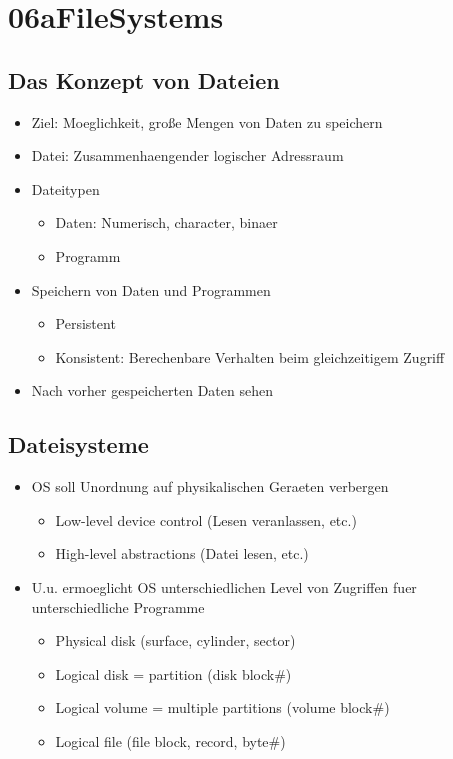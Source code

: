 \documentclass[a4paper]{scrreprt}
\begin{document}
\chapter{06aFileSystems}

\section{Das Konzept von Dateien}
\begin{itemize}
	\item Ziel: Moeglichkeit, große Mengen von Daten zu speichern
	\item Datei: Zusammenhaengender logischer Adressraum
	\item Dateitypen
		\begin{itemize}
			\item Daten: Numerisch, character, binaer
			\item Programm
		\end{itemize}
	\item Speichern von Daten und Programmen
		\begin{itemize}
			\item Persistent
			\item Konsistent: Berechenbare Verhalten beim gleichzeitigem Zugriff
		\end{itemize}
	\item Nach vorher gespeicherten Daten sehen
\end{itemize}

\section{Dateisysteme}
\begin{itemize}
	\item OS soll Unordnung auf physikalischen Geraeten verbergen
		\begin{itemize}
			\item Low-level device control (Lesen veranlassen, etc.)
			\item High-level abstractions (Datei lesen, etc.)
		\end{itemize}
	\item U.u. ermoeglicht OS unterschiedlichen Level von Zugriffen fuer unterschiedliche Programme
		\begin{itemize}
			\item Physical disk (surface, cylinder, sector)
			\item Logical disk = partition (disk block\#)
			\item Logical volume = multiple partitions (volume block\#)
			\item Logical file (file block, record, byte\#)
		\end{itemize}
\end{itemize}
\end{document}
